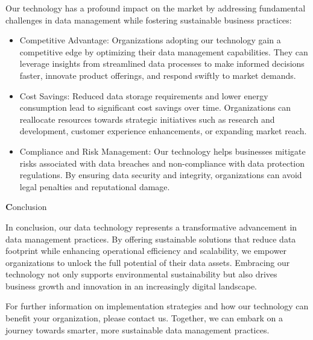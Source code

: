 Our  technology has a profound impact on the market by addressing fundamental challenges in data management  while fostering sustainable business practices:

\begin{itemize}
\item Competitive Advantage: Organizations adopting our technology gain a competitive edge by optimizing their data management capabilities. They can leverage insights from streamlined data processes to make informed decisions faster, innovate product offerings, and respond swiftly to market demands.
\item Cost Savings: Reduced data storage requirements and lower energy consumption lead to significant cost savings over time. Organizations can reallocate resources towards strategic initiatives such as research and development, customer experience enhancements, or expanding market reach.
\item Compliance and Risk Management: Our technology helps businesses mitigate risks associated with data breaches and non-compliance with data protection regulations. By ensuring data security and integrity, organizations can avoid legal penalties and reputational damage.

\end{itemize}

{\textbf Conclusion}

In conclusion, our data technology represents a transformative advancement in data management practices. By offering sustainable solutions that reduce data footprint while enhancing operational efficiency and scalability, we empower organizations to unlock the full potential of their data assets. Embracing our technology not only supports environmental sustainability but also drives business growth and innovation in an increasingly digital landscape.

For further information on implementation strategies and how our technology can benefit your organization, please contact us. Together, we can embark on a journey towards smarter, more sustainable data management practices.